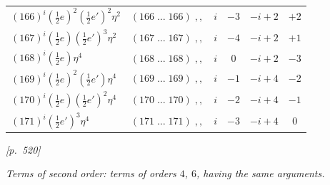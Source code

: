 \documentclass[11pt]{article}
\begin{document}
\begin{center}
\begin{tabular}{|l|c|c|c|c|c|}
$(166)^i(\tfrac{1}{2}e)^2(\tfrac{1}{2}e')^2\eta^2$ & $(166\;\ldots\;166)\;,,$ & $i$ & $-3$ & $-i+2$ & $+2$ \\
$(167)^i(\tfrac{1}{2}e)(\tfrac{1}{2}e')^3\eta^2$ & $(167\;\ldots\;167)\;,,$ & $i$ & $-4$ & $-i+2$ & $+1$ \\
$(168)^i(\tfrac{1}{2}e)\eta^4$ & $(168\;\ldots\;168)\;,,$ & $i$ & $0$ & $-i+2$ & $-3$ \\
$(169)^i(\tfrac{1}{2}e)^2(\tfrac{1}{2}e')\eta^4$ & $(169\;\ldots\;169)\;,,$ & $i$ & $-1$ & $-i+4$ & $-2$ \\
$(170)^i(\tfrac{1}{2}e)(\tfrac{1}{2}e')^2\eta^4$ & $(170\;\ldots\;170)\;,,$ & $i$ & $-2$ & $-i+4$ & $-1$ \\
$(171)^i(\tfrac{1}{2}e')^3\eta^4$ & $(171\;\ldots\;171)\;,,$ & $i$ & $-3$ & $-i+4$ & $0$ \\
\hline
\end{tabular}
\end{center}


\newpage
\noindent\textit{[p.~520]}

\medskip

\textit{Terms of second order: terms of orders $4$, $6$, having the same arguments.}

\smallskip
\end{document}
